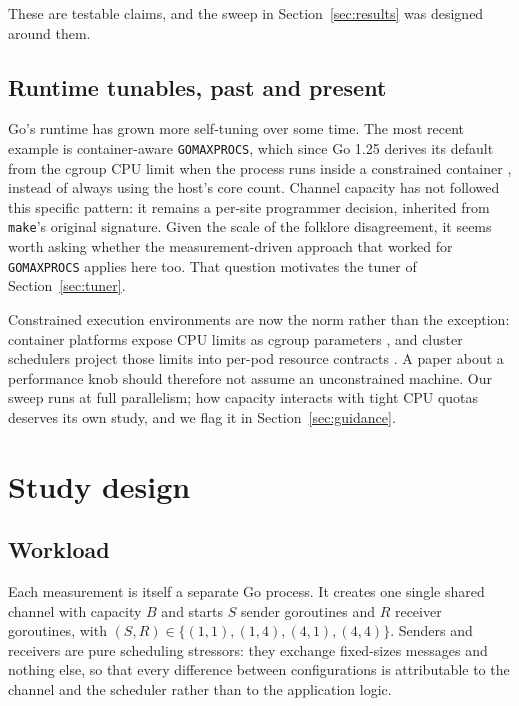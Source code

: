 \documentclass[10pt,a4paper]{article}
\begin{document}
These are testable claims, and the sweep in Section~\ref{sec:results} was
designed around them.

\subsection{Runtime tunables, past and present}
\label{sec:bg-tunables}

Go's runtime has grown more self-tuning over some time. The most recent example is
container-aware \texttt{GOMAXPROCS}, which since Go 1.25 derives its default
from the cgroup CPU limit when the process runs inside a constrained container
\cite{go125}, instead of always using the host's core count. Channel capacity
has not followed this specific pattern: it remains a per-site programmer
decision, inherited from \texttt{make}'s original signature. Given the scale of
the folklore disagreement, it seems worth asking whether the measurement-driven
approach that worked for \texttt{GOMAXPROCS} applies here too. That question
motivates the tuner of Section~\ref{sec:tuner}.

Constrained execution environments are now the norm rather than the exception:
container platforms expose CPU limits as cgroup parameters \cite{cgrouppv2},
and cluster schedulers project those limits into per-pod resource contracts
\cite{k8sres}. A paper about a performance knob should therefore not assume an
unconstrained machine. Our sweep runs at full parallelism; how capacity
interacts with tight CPU quotas deserves its own study, and we flag it in
Section~\ref{sec:guidance}.

\section{Study design}
\label{sec:method}

\subsection{Workload}
\label{sec:method-workload}

Each measurement is itself a separate Go process. It creates one single shared
channel with capacity $B$ and starts $S$ sender goroutines and $R$ receiver
goroutines, with $(S,R) \in \{(1,1), (1,4), (4,1), (4,4)\}$. Senders and
receivers are pure scheduling stressors: they exchange fixed-sizes messages and
nothing else, so that every difference between configurations is attributable
to the channel and the scheduler rather than to the application logic.
\end{document}
